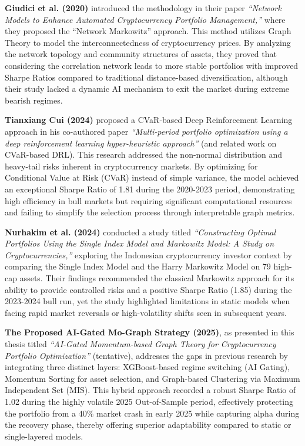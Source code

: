 \documentclass[12pt, a4paper]{article}
\begin{document}
\textbf{Giudici et al. (2020)} introduced the methodology in their paper \textit{``Network Models to Enhance Automated Cryptocurrency Portfolio Management,''} where they proposed the ``Network Markowitz'' approach. This method utilizes Graph Theory to model the interconnectedness of cryptocurrency prices. By analyzing the network topology and community structures of assets, they proved that considering the correlation network leads to more stable portfolios with improved Sharpe Ratios compared to traditional distance-based diversification, although their study lacked a dynamic AI mechanism to exit the market during extreme bearish regimes.

\textbf{Tianxiang Cui (2024)} proposed a CVaR-based Deep Reinforcement Learning approach in his co-authored paper \textit{``Multi-period portfolio optimization using a deep reinforcement learning hyper-heuristic approach''} (and related work on CVaR-based DRL). This research addressed the non-normal distribution and heavy-tail risks inherent in cryptocurrency markets. By optimizing for Conditional Value at Risk (CVaR) instead of simple variance, the model achieved an exceptional Sharpe Ratio of 1.81 during the 2020-2023 period, demonstrating high efficiency in bull markets but requiring significant computational resources and failing to simplify the selection process through interpretable graph metrics.

\textbf{Nurhakim et al. (2024)} conducted a study titled \textit{``Constructing Optimal Portfolios Using the Single Index Model and Markowitz Model: A Study on Cryptocurrencies,''} exploring the Indonesian cryptocurrency investor context by comparing the Single Index Model and the Harry Markowitz Model on 79 high-cap assets. Their findings recommended the classical Markowitz approach for its ability to provide controlled risks and a positive Sharpe Ratio (1.85) during the 2023-2024 bull run, yet the study highlighted limitations in static models when facing rapid market reversals or high-volatility shifts seen in subsequent years.

\textbf{The Proposed AI-Gated Mo-Graph Strategy (2025)}, as presented in this thesis titled \textit{``AI-Gated Momentum-based Graph Theory for Cryptocurrency Portfolio Optimization''} (tentative), addresses the gaps in previous research by integrating three distinct layers: XGBoost-based regime switching (AI Gating), Momentum Sorting for asset selection, and Graph-based Clustering via Maximum Independent Set (MIS). This hybrid approach recorded a robust Sharpe Ratio of 1.02 during the highly volatile 2025 Out-of-Sample period, effectively protecting the portfolio from a 40\% market crash in early 2025 while capturing alpha during the recovery phase, thereby offering superior adaptability compared to static or single-layered models.
\end{document}
